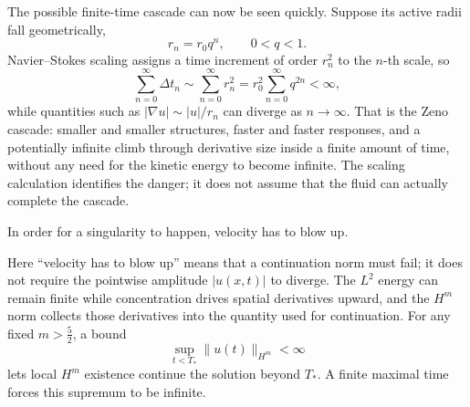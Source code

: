 \documentclass[11pt]{article}
\begin{document}
The possible finite-time cascade can now be seen quickly.  Suppose its active radii fall geometrically,
\[
r_n=r_0q^n,
\qquad 0<q<1.
\]
Navier--Stokes scaling assigns a time increment of order \(r_n^2\) to the \(n\)-th scale, so
\[
\sum_{n=0}^{\infty}\Delta t_n
\sim
\sum_{n=0}^{\infty}r_n^2
=r_0^2\sum_{n=0}^{\infty}q^{2n}
<\infty,
\]
while quantities such as \(|\nabla u|\sim |u|/r_n\) can diverge as \(n\to\infty\).  That is the Zeno cascade: smaller and smaller structures, faster and faster responses, and a potentially infinite climb through derivative size inside a finite amount of time, without any need for the kinetic energy to become infinite.  The scaling calculation identifies the danger; it does not assume that the fluid can actually complete the cascade.

In order for a singularity to happen, velocity has to blow up.

Here ``velocity has to blow up'' means that a continuation norm must fail; it does not require the pointwise amplitude \(|u(x,t)|\) to diverge.  The \(L^2\) energy can remain finite while concentration drives spatial derivatives upward, and the \(H^m\) norm collects those derivatives into the quantity used for continuation.  For any fixed \(m>\tfrac52\), a bound
\[
\sup_{t<T_*}\|u(t)\|_{H^m}<\infty
\]
lets local \(H^m\) existence continue the solution beyond \(T_*\).  A finite maximal time forces this supremum to be infinite.
\end{document}
